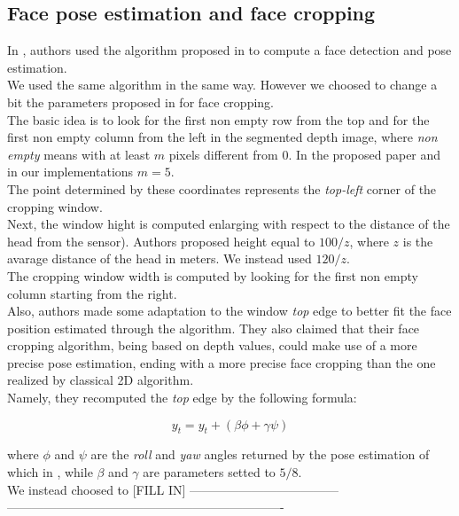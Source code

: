 \documentclass{article}
\begin{document}
\subsection{Face pose estimation and face cropping}
\label{sec:cropping}
In \citep{Hayat2016}, authors used the algorithm proposed in \citep{Fanelli2011} to compute a face detection and pose estimation.
\\
We used the same algorithm in the same way. However we choosed to change a bit
the parameters proposed in \citep{Hayat2016} for face cropping.
\\
The basic idea is to look for the first non empty row from the top and for the
first non empty column from the left in the segmented depth image, where
\textit{non empty} means with at least $m$ pixels different from $0$. In the
proposed paper and in our implementations $m = 5$.
\\
The point determined by these coordinates represents the \textit{top-left}
corner of the cropping window.
\\
Next, the window hight is computed enlarging with respect to the distance of
the head from the sensor). Authors proposed height equal to $100/z$, where $z$
is the avarage distance of the head in meters. We instead used $120/z$.
\\
The cropping window width is computed by looking for the first non empty column
starting from the right.
\\
Also, authors made some adaptation to the window \textit{top} edge to better
fit the face position estimated through the algorithm. They also claimed that
their face cropping algorithm, being based on depth values, could make use of a
more precise pose estimation, ending with a more precise face cropping than the
one realized by classical 2D algorithm.
\\
Namely, they recomputed the \textit{top} edge by the following formula:

$$y_t = y_t + (\beta \phi +\gamma \psi)$$

where $\phi$ and $\psi$ are the \textit{roll} and \textit{yaw} angles returned
by the pose estimation of which in \citep{Fanelli2011}, while $\beta$ and
$\gamma$ are parameters setted to $5/8$.
\\
We instead choosed to [FILL IN] ------------------------------------
-------------------------------------------------------------------
\\
\end{document}
